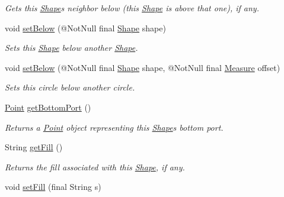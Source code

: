 \begin{DoxyCompactItemize}
\begin{DoxyCompactList}\small\item\em Gets this \hyperlink{classcom_1_1aarrelaakso_1_1drawl_1_1_shape}{Shape}\textquotesingle{}s neighbor below (this \hyperlink{classcom_1_1aarrelaakso_1_1drawl_1_1_shape}{Shape} is above that one), if any. \end{DoxyCompactList}\item 
void \hyperlink{classcom_1_1aarrelaakso_1_1drawl_1_1_shape_a4147526667449f5beb534d4404ba8f77}{set\+Below} (@Not\+Null final \hyperlink{classcom_1_1aarrelaakso_1_1drawl_1_1_shape}{Shape} shape)
\begin{DoxyCompactList}\small\item\em Sets this \hyperlink{classcom_1_1aarrelaakso_1_1drawl_1_1_shape}{Shape} below another \hyperlink{classcom_1_1aarrelaakso_1_1drawl_1_1_shape}{Shape}. \end{DoxyCompactList}\item 
void \hyperlink{classcom_1_1aarrelaakso_1_1drawl_1_1_shape_a63c902c4e79235901744c6d83544fa54}{set\+Below} (@Not\+Null final \hyperlink{classcom_1_1aarrelaakso_1_1drawl_1_1_shape}{Shape} shape, @Not\+Null final \hyperlink{classcom_1_1aarrelaakso_1_1drawl_1_1_measure}{Measure} offset)
\begin{DoxyCompactList}\small\item\em Sets this circle below another circle. \end{DoxyCompactList}\item 
\hyperlink{classcom_1_1aarrelaakso_1_1drawl_1_1_point}{Point} \hyperlink{classcom_1_1aarrelaakso_1_1drawl_1_1_shape_aba14efe9a16c0808580963c66b171082}{get\+Bottom\+Port} ()
\begin{DoxyCompactList}\small\item\em Returns a \hyperlink{classcom_1_1aarrelaakso_1_1drawl_1_1_point}{Point} object representing this \hyperlink{classcom_1_1aarrelaakso_1_1drawl_1_1_shape}{Shape}\textquotesingle{}s bottom port. \end{DoxyCompactList}\item 
String \hyperlink{classcom_1_1aarrelaakso_1_1drawl_1_1_shape_a0d9a33a3e151aaceeec140bea343a650}{get\+Fill} ()
\begin{DoxyCompactList}\small\item\em Returns the fill associated with this \hyperlink{classcom_1_1aarrelaakso_1_1drawl_1_1_shape}{Shape}, if any. \end{DoxyCompactList}\item 
void \hyperlink{classcom_1_1aarrelaakso_1_1drawl_1_1_shape_a81ff4feb49b8f74c1a639564748a23ee}{set\+Fill} (final String s)

\end{DoxyCompactItemize}
